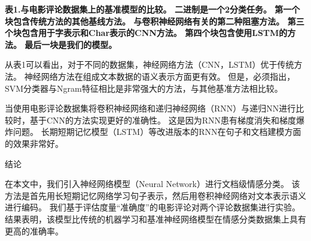 \documentclass[a4paper,AutoFakeBold,oneside,12pt]{book}
\begin{document}

\textbf{表1.与电影评论数据集上的基准模型的比较。 二进制是一个2分类任务。 第一个块包含传统方法的其他基线方法。 与卷积神经网络有关的第二种阻塞方法。 第三个块包含用于字表示和Char表示的CNN方法。 第四个块包含使用LSTM的方法。 最后一块是我们的模型。}

从表1可以看出，对于不同的数据集，神经网络方法（CNN，LSTM）优于传统方法。 神经网络方法在组成文本数据的语义表示方面更有效。 但是，必须指出，SVM分类器与Ngram特征相比是非常强大的方法，与其他基准方法相比较。

当使用电影评论数据集将卷积神经网络和递归神经网络（RNN）与递归NN进行比较时，基于CNN的方法实现更好的准确性。 这是因为RNN患有梯度消失和梯度爆炸问题。 长期短期记忆模型（LSTM）等改进版本的RNN在句子和文档建模方面的效果非常好。

结论

在本文中，我们引入神经网络模型（Neural Network）进行文档级情感分类。 该方法是首先用长短期记忆网络学习句子表示，然后用卷积神经网络对文本表示语义进行编码。 我们基于评估度量“准确度”的电影评论对两个评论数据集进行实验。 结果表明，该模型比传统的机器学习和基准神经网络模型在情感分类数据集上具有更高的准确率。







\mbox{}
\thispagestyle{empty}
\newpage


\end{document}
